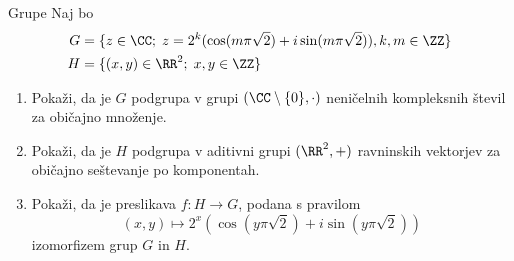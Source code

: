\begin{frame}{Grupe}
	Naj bo
	\begin{align*}
		G &= \{z\in\CC;\; z=2^k(\cos(m\pi\sqrt{2})+i\sin(m\pi\sqrt{2})), k,m\in\ZZ\} \\
		H &= \{(x,y)\in\RR^2;\; x,y \in \ZZ\}
	\end{align*}
	\begin{enumerate}
		\item
			Pokaži, da je $G$ podgrupa v grupi \((\CC\setminus\{0\},\cdot)\)
			neničelnih kompleksnih števil za običajno množenje.
		\item
			Pokaži, da je $H$ podgrupa v aditivni grupi \((\RR^2,+)\)
			ravninskih vektorjev za običajno seštevanje po komponentah.
		\item
			Pokaži, da je preslikava $f:H\to G$, podana s pravilom
			\[(x,y)\mapsto 2^x(\cos(y\pi\sqrt{2})+i\sin(y\pi\sqrt{2}))\]
			izomorfizem grup $G$ in $H$.
	\end{enumerate}
\end{frame}
